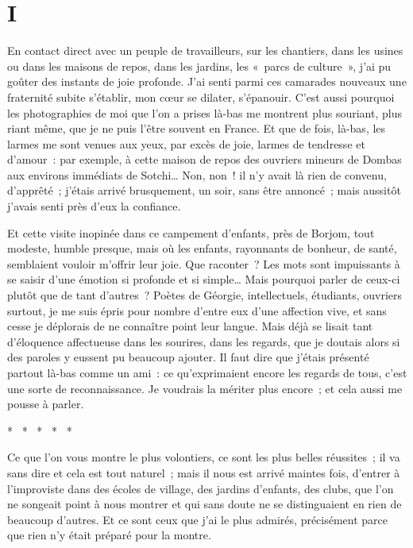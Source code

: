 \documentclass[french,twoside]{book} %
\begin{document}
\section[{I}]{I}\renewcommand{\leftmark}{I}

\noindent En contact direct avec un peuple de travailleurs, sur les chantiers, dans les usines ou dans les maisons de repos, dans les jardins, les « parcs de culture », j’ai pu goûter des instants de joie profonde. J’ai senti parmi ces camarades nouveaux une fraternité subite s’établir, mon cœur se dilater, s’épanouir. C’est aussi pourquoi les photographies de moi que l’on a prises là-bas me montrent plus souriant, plus riant même, que je ne puis l’être souvent en France. Et que de fois, là-bas, les larmes me sont venues aux yeux, par excès de joie, larmes de tendresse et d’amour : par exemple, à cette maison de repos des ouvriers mineurs de Dombas aux environs immédiats de Sotchi… Non, non ! il n’y avait là rien de convenu, d’apprêté ; j’étais arrivé brusquement, un soir, sans être annoncé ; mais aussitôt j’avais senti près d’eux la confiance.\par
Et cette visite inopinée dans ce campement d’enfants, près de Borjom, tout modeste, humble presque, mais où les enfants, rayonnants de bonheur, de santé, semblaient vouloir m’offrir leur joie. Que raconter ? Les mots sont impuissants à se saisir d’une émotion si profonde et si simple… Mais pourquoi parler de ceux-ci plutôt que de tant d’autres ? Poètes de Géorgie, intellectuels, étudiants, ouvriers surtout, je me suis épris pour nombre d’entre eux d’une affection vive, et sans cesse je déplorais de ne connaître point leur langue. Mais déjà se lisait tant d’éloquence affectueuse dans les sourires, dans les regards, que je doutais alors si des paroles y eussent pu beaucoup ajouter. Il faut dire que j’étais présenté partout là-bas comme un ami : ce qu’exprimaient encore les regards de tous, c’est une sorte de reconnaissance. Je voudrais la mériter plus encore ; et cela aussi me pousse à parler.\par

\begin{center}
\noindent \centerline{*  *  *  *  *}\par
\end{center}

\noindent Ce que l’on vous montre le plus volontiers, ce sont les plus belles réussites ; il va sans dire et cela est tout naturel ; mais il nous est arrivé maintes fois, d’entrer à l’improviste dans des écoles de village, des jardins d’enfants, des clubs, que l’on ne songeait point à nous montrer et qui sans doute ne se distinguaient en rien de beaucoup d’autres. Et ce sont ceux que j’ai le plus admirés, précisément parce que rien n’y était préparé pour la montre.\par
\end{document}
